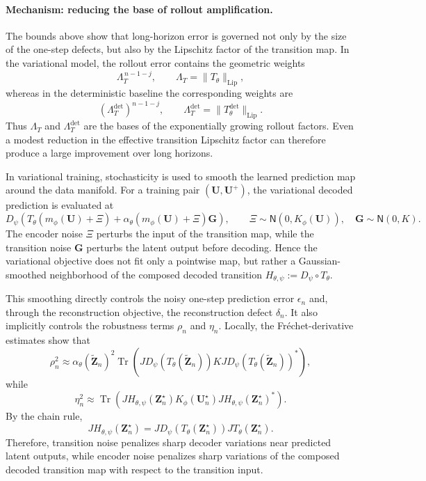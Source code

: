 \documentclass[11pt]{article}
\begin{document}
\paragraph{Mechanism: reducing the base of rollout amplification.}
The bounds above show that long-horizon error is governed not only by the size of the one-step defects, but also by the Lipschitz factor of the transition map. In the variational model, the rollout error contains the geometric weights
\[
    \Lambda_T^{\,n-1-j},
    \qquad
    \Lambda_T=\|T_\theta\|_{\mathrm{Lip}},
\]
whereas in the deterministic baseline the corresponding weights are
\[
    \left(\Lambda_T^{\mathrm{det}}\right)^{n-1-j},
    \qquad
    \Lambda_T^{\mathrm{det}}
    =
    \|T_\theta^{\mathrm{det}}\|_{\mathrm{Lip}} .
\]
Thus $\Lambda_T$ and $\Lambda_T^{\mathrm{det}}$ are the bases of the exponentially growing rollout factors. Even a modest reduction in the effective transition Lipschitz factor can therefore produce a large improvement over long horizons.

In variational training, stochasticity is used to smooth the learned prediction map around the data
manifold. For a training pair $(\mathbf U,\mathbf U^+)$, the variational decoded prediction is
evaluated at
\[
    D_\psi\!\left(
    T_\theta(m_\phi(\mathbf U)+\Xi)
    +
    \alpha_\theta(m_\phi(\mathbf U)+\Xi)\mathbf G
    \right),
    \qquad
    \Xi\sim\mathsf N(0,K_\phi(\mathbf U)),
    \quad
    \mathbf G\sim\mathsf N(0,K).
\]
The encoder noise $\Xi$ perturbs the input of the transition map, while the transition noise $\mathbf G$ perturbs the latent output before decoding. Hence the variational objective does not fit only a pointwise map, but rather a Gaussian-smoothed neighborhood of the composed decoded transition $H_{\theta,\psi}:=D_\psi\circ T_\theta$.

This smoothing directly controls the noisy one-step prediction error $\epsilon_n$ and, through the reconstruction objective, the reconstruction defect $\delta_n$. It also implicitly controls the robustness terms $\rho_n$ and $\eta_n$. Locally, the Fr\'echet-derivative estimates show that
\[
    \rho_n^2
    \approx
    \alpha_\theta(\widetilde{\mathbf Z}_n)^2
    \operatorname{Tr}
    \left(
    JD_\psi(T_\theta(\widetilde{\mathbf Z}_n))
    K
    JD_\psi(T_\theta(\widetilde{\mathbf Z}_n))^\ast
    \right),
\]
while
\[
    \eta_n^2
    \approx
    \operatorname{Tr}
    \left(
    JH_{\theta,\psi}(\mathbf Z_n^\star)
    K_\phi(\mathbf U_n^\star)
    JH_{\theta,\psi}(\mathbf Z_n^\star)^\ast
    \right).
\]
By the chain rule,
\[
    JH_{\theta,\psi}(\mathbf Z_n^\star)
    =
    JD_\psi(T_\theta(\mathbf Z_n^\star))
    JT_\theta(\mathbf Z_n^\star).
\]
Therefore, transition noise penalizes sharp decoder variations near predicted latent outputs, while encoder noise penalizes sharp variations of the composed decoded transition map with respect to the transition input.
\end{document}

